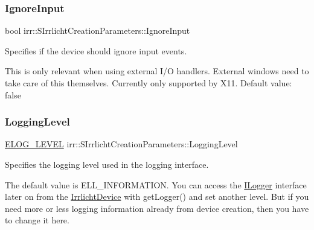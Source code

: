 \subsubsection{\texorpdfstring{Ignore\+Input}{IgnoreInput}}
{\footnotesize\ttfamily bool irr\+::\+S\+Irrlicht\+Creation\+Parameters\+::\+Ignore\+Input}



Specifies if the device should ignore input events. 

This is only relevant when using external I/O handlers. External windows need to take care of this themselves. Currently only supported by X11. Default value\+: false \mbox{\label{structirr_1_1SIrrlichtCreationParameters_a2aa305ffabdd842084ddef5014b3e411}} 
\subsubsection{\texorpdfstring{Logging\+Level}{LoggingLevel}}
{\footnotesize\ttfamily \hyperlink{namespaceirr_aa2d1cac68606a25ed24cfffccfa30a92}{E\+L\+O\+G\+\_\+\+L\+E\+V\+EL} irr\+::\+S\+Irrlicht\+Creation\+Parameters\+::\+Logging\+Level}



Specifies the logging level used in the logging interface. 

The default value is E\+L\+L\+\_\+\+I\+N\+F\+O\+R\+M\+A\+T\+I\+ON. You can access the \hyperlink{classirr_1_1ILogger}{I\+Logger} interface later on from the \hyperlink{classirr_1_1IrrlichtDevice}{Irrlicht\+Device} with get\+Logger() and set another level. But if you need more or less logging information already from device creation, then you have to change it here. \mbox{\label{structirr_1_1SIrrlichtCreationParameters_af30f104af135b97d3e19fecaf2c10e45}} 
